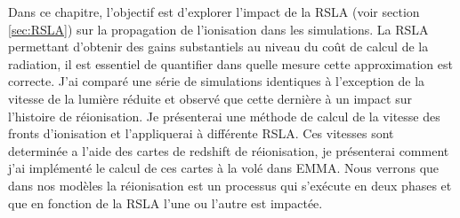 

Dans ce chapitre, l'objectif est d'explorer l'impact de la \ac{RSLA} (voir section \ref{sec:RSLA}) sur la propagation de l'ionisation dans les simulations.
La \ac{RSLA} permettant d'obtenir des gains substantiels au niveau du coût de calcul de la radiation, il est essentiel de quantifier dans quelle mesure cette approximation est correcte.
J'ai comparé une série de simulations identiques à l'exception de la vitesse de la lumière réduite et observé que cette dernière à un impact sur l'histoire de réionisation.
Je présenterai une méthode de calcul de la vitesse des fronts d'ionisation et l'appliquerai à différente \ac{RSLA}.
Ces vitesses sont determinée a l'aide des cartes de redshift de réionisation, je présenterai comment j'ai implémenté le calcul de ces cartes à la volé dans EMMA.
Nous verrons que dans nos modèles la réionisation est un processus qui s’exécute en deux phases et que en fonction de la \ac{RSLA} l'une ou l'autre est impactée.


%



